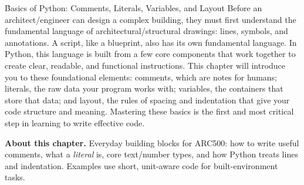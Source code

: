 

\h{Basics of Python: Comments, Literals, Variables, and Layout}
Before an architect/engineer can design a complex building, they must first understand the fundamental language of architectural/structural drawings: lines, symbols, and annotations. A script, like a blueprint, also has its own fundamental language. In Python, this language is built from a few core components that work together to create clear, readable, and functional instructions. This chapter will introduce you to these foundational elements: comments, which are notes for humans; literals, the raw data your program works with; variables, the containers that store that data; and layout, the rules of spacing and indentation that give your code structure and meaning. Mastering these basics is the first and most critical step in learning to write effective code.
\medskip

\begin{NoteBox}
\textbf{About this chapter.} Everyday building blocks for ARC500: how to write useful comments, what a \emph{literal} is, core text/number types, and how Python treats lines and indentation. Examples use short, unit-aware code for built-environment tasks.
\end{NoteBox}
\medskip

